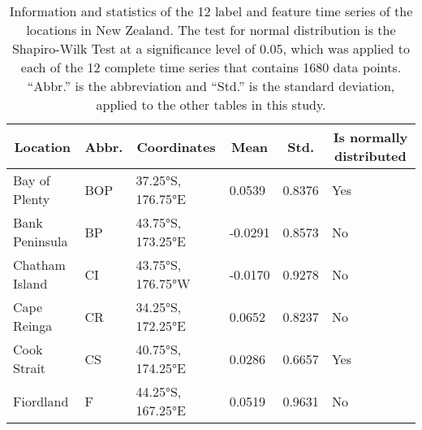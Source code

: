 \documentclass[11pt, a4paper]{article}
\begin{document}
\begin{table}[H]
\centering
\scriptsize
\caption{Information and statistics of the 12 label and feature time series of the locations in New Zealand. The test for normal distribution is the Shapiro-Wilk Test \citep{shapiro1965analysis} at a significance level of 0.05, which was applied to each of the 12 complete time series that contains 1680 data points. ``Abbr.'' is the abbreviation and ``Std.'' is the standard deviation, applied to the other tables in this study.}\label{tb:label}
\begin{tabular}{llllll}
\multicolumn{1}{c}{\textbf{Location}} & \multicolumn{1}{c}{\textbf{Abbr.}} & \multicolumn{1}{c}{\textbf{Coordinates}} & \multicolumn{1}{c}{\textbf{Mean}} & \multicolumn{1}{c}{\textbf{Std.}} & \multicolumn{1}{c}{\textbf{Is normally distributed}} \\ \hline
Bay of Plenty                         & BOP                                & 37.25°S, 176.75°E                       & 0.0539                            & 0.8376                            & Yes                                                  \\
Bank Peninsula                        & BP                                 & 43.75°S, 173.25°E                       & -0.0291                           & 0.8573                            & No                                                   \\
Chatham Island                        & CI                                 & 43.75°S, 176.75°W                       & -0.0170                           & 0.9278                            & No                                                   \\
Cape Reinga                           & CR                                 & 34.25°S, 172.25°E                       & 0.0652                            & 0.8237                            & No                                                   \\
Cook Strait                           & CS                                 & 40.75°S, 174.25°E                       & 0.0286                            & 0.6657                            & Yes                                                  \\
Fiordland                             & F                                  & 44.25°S, 167.25°E                       & 0.0519                            & 0.9631                            & No                                                   \\

\end{tabular}
\end{table}
\end{document}
